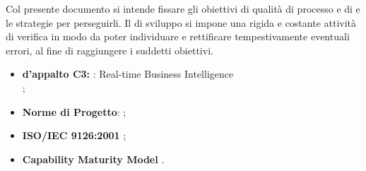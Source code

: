 
	
		Col presente documento si intende fissare gli obiettivi di qualità di processo e di  e le strategie per perseguirli. 
		Il  di sviluppo si impone una rigida e costante attività di verifica in modo da poter individuare e 
		rettificare tempestivamente eventuali errori, al fine di raggiungere i suddetti obiettivi.
		
	


			\begin{itemize}
				\item \textbf{ d'appalto C3:} \projectname{}: Real-time Business Intelligence \\
					;
				\item \textbf{Norme di Progetto}: ;
				\item \textbf{ISO/IEC 9126:2001} ;
				\item \textbf{Capability Maturity Model} .
			\end{itemize}
		


